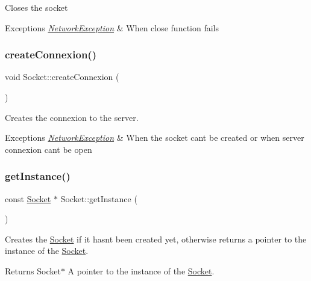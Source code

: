 Closes the socket 
\begin{DoxyExceptions}{Exceptions}
{\em \hyperlink{class_network_exception}{Network\+Exception}} & When close function fails \\
\hline
\end{DoxyExceptions}
\hypertarget{class_socket_a2571482be5b97e7b2beac7abf543a025}{}\label{class_socket_a2571482be5b97e7b2beac7abf543a025} 
\subsubsection{\texorpdfstring{create\+Connexion()}{createConnexion()}}
{\footnotesize\ttfamily void Socket\+::create\+Connexion (\begin{DoxyParamCaption}{ }\end{DoxyParamCaption})\hspace{0.3cm}{\ttfamily [static]}}

Creates the connexion to the server. 
\begin{DoxyExceptions}{Exceptions}
{\em \hyperlink{class_network_exception}{Network\+Exception}} & When the socket can\textquotesingle{}t be created or when server connexion can\textquotesingle{}t be open \\
\hline
\end{DoxyExceptions}
\hypertarget{class_socket_ad5d9fff005dee4de1de73ee22c42fad4}{}\label{class_socket_ad5d9fff005dee4de1de73ee22c42fad4} 
\subsubsection{\texorpdfstring{get\+Instance()}{getInstance()}}
{\footnotesize\ttfamily const \hyperlink{class_socket}{Socket} $\ast$ Socket\+::get\+Instance (\begin{DoxyParamCaption}{ }\end{DoxyParamCaption})\hspace{0.3cm}{\ttfamily [static]}}

Creates the \hyperlink{class_socket}{Socket} if it hasn\textquotesingle{}t been created yet, otherwise returns a pointer to the instance of the \hyperlink{class_socket}{Socket}. \begin{DoxyReturn}{Returns}
Socket$\ast$ A pointer to the instance of the \hyperlink{class_socket}{Socket}. 
\end{DoxyReturn}
\hypertarget{class_socket_ae41cf538ddff9d547b1a6c43529e6d26}{}\label{class_socket_ae41cf538ddff9d547b1a6c43529e6d26} 

